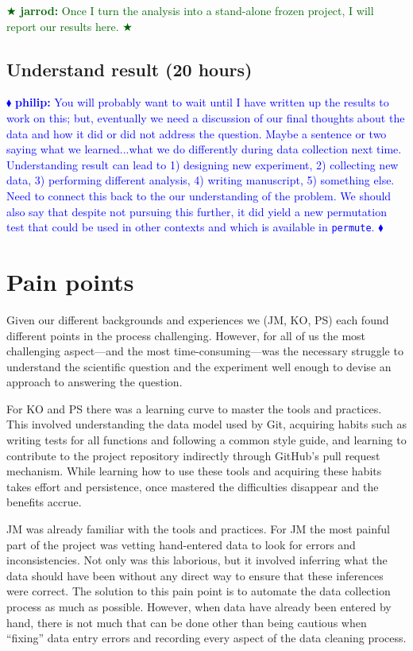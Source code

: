 \documentclass[]{article}
\newcommand{\philip}[1] { \textcolor{blue} {
\ensuremath{\blacklozenge} {\bf philip:}  {#1}
\ensuremath{\blacklozenge} } }
\newcommand{\jarrod}[1] { \textcolor{darkgreen} {
\ensuremath{\bigstar} {\bf jarrod:}  {#1}
\ensuremath{\bigstar} } }
\begin{document}
\jarrod{Once I turn the analysis into a stand-alone frozen project, I
will report our results here.}

\subsection{Understand result (20 hours)}

\philip{You will probably want to wait until I have written up the results to
work on this; but, eventually we need a discussion of our final thoughts about
the data and how it did or did not address the question.  Maybe a sentence or
two saying what we learned...what we do differently during data collection next
time.  Understanding result can lead to 1) designing new experiment, 2)
collecting new data, 3) performing different analysis, 4) writing manuscript,
5) something else.  Need to connect this back to the our understanding of the
problem.  We should also say that despite not pursuing this further, it did
yield a new permutation test that could be used in other contexts and which is
available in \texttt{permute}.  }

\section{Pain points}\label{pain-points}

Given our different backgrounds and experiences we (JM, KO, PS) each found
different points in the process challenging. 
However, for all of us the most challenging aspect---and the most 
time-consuming---was the necessary
struggle to understand the scientific question and the experiment
well enough to devise an approach to answering the question.

For KO and PS there was a learning curve to master the tools and practices.
This involved understanding the data model used by Git, acquiring habits such
as writing tests for all functions and following a common style guide, and
learning to contribute to the project repository indirectly through GitHub's
pull request mechanism.
While learning how to use these tools and acquiring these habits takes effort
and persistence, once mastered the difficulties disappear and the benefits
accrue.

JM was already familiar with the tools and practices.
For JM the most painful part of the project was vetting hand-entered data
to look for errors and inconsistencies.
Not only was this laborious, but it involved inferring what the data
should have been without any direct way to ensure that these inferences were
correct.
The solution to this pain point is to automate the data collection process as
much as possible.
However, when data have already been entered by hand, there is not much that can
be done other than being cautious when ``fixing'' data entry errors and recording
every aspect of the data cleaning process.
\end{document}
